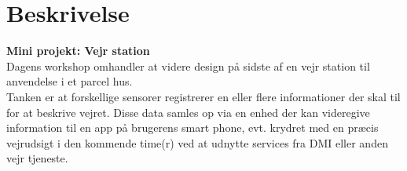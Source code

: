 \documentclass[11pt]{article}
\renewcommand{\baselinestretch}{1.20}
\begin{document}
    
    
    
    \renewcommand{\baselinestretch}{0.8}
    \tableofcontents
    \renewcommand{\baselinestretch}{1.20}
    
    \section{Beskrivelse}
    \textbf{Mini projekt: Vejr station}\\
    Dagens workshop omhandler at videre design på sidste  af en vejr station til anvendelse i et parcel hus. \\
    Tanken er at forskellige sensorer registrerer en eller flere informationer der skal til for at beskrive
    vejret. Disse data samles op via en enhed der kan videregive information til en app på brugerens smart
    phone, evt. krydret med en præcis vejrudsigt i den kommende time(r) ved at udnytte services fra DMI
    eller anden vejr tjeneste.
    
    \newpage
    
    
    \newpage
    
    
    \newpage
    
    
    \newpage
    
    
    
\end{document}

